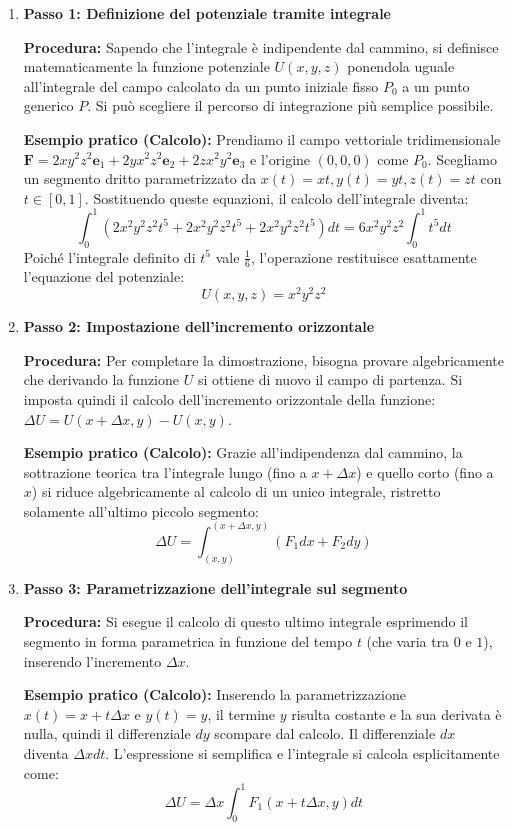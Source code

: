 \begin{enumerate}
    \item \textbf{Passo 1: Definizione del potenziale tramite integrale}
    
    \textbf{Procedura:} Sapendo che l'integrale è indipendente dal cammino, si definisce matematicamente la funzione potenziale $U(x,y,z)$ ponendola uguale all'integrale del campo calcolato da un punto iniziale fisso $P_0$ a un punto generico $P$. Si può scegliere il percorso di integrazione più semplice possibile.
    
    \textbf{Esempio pratico (Calcolo):} Prendiamo il campo vettoriale tridimensionale $\mathbf{F} = 2xy^2z^2 \mathbf{e}_1 + 2yx^2z^2 \mathbf{e}_2 + 2zx^2y^2 \mathbf{e}_3$ e l'origine $(0,0,0)$ come $P_0$. Scegliamo un segmento dritto parametrizzato da $x(t)=xt, y(t)=yt, z(t)=zt$ con $t \in [0,1]$. Sostituendo queste equazioni, il calcolo dell'integrale diventa:
    \[
    \int_{0}^{1} (2x^2y^2z^2 t^5 + 2x^2y^2z^2 t^5 + 2x^2y^2z^2 t^5) dt = 6x^2y^2z^2 \int_{0}^{1} t^5 dt
    \]
    Poiché l'integrale definito di $t^5$ vale $\frac{1}{6}$, l'operazione restituisce esattamente l'equazione del potenziale:
    \[
    U(x,y,z) = x^2y^2z^2
    \]

    \item \textbf{Passo 2: Impostazione dell'incremento orizzontale}
    
    \textbf{Procedura:} Per completare la dimostrazione, bisogna provare algebricamente che derivando la funzione $U$ si ottiene di nuovo il campo di partenza. Si imposta quindi il calcolo dell'incremento orizzontale della funzione: $\Delta U = U(x+\Delta x, y) - U(x,y)$.
    
    \textbf{Esempio pratico (Calcolo):} Grazie all'indipendenza dal cammino, la sottrazione teorica tra l'integrale lungo (fino a $x+\Delta x$) e quello corto (fino a $x$) si riduce algebricamente al calcolo di un unico integrale, ristretto solamente all'ultimo piccolo segmento:
    \[
    \Delta U = \int_{(x,y)}^{(x+\Delta x, y)} (F_1 dx + F_2 dy)
    \]

    \item \textbf{Passo 3: Parametrizzazione dell'integrale sul segmento}
    
    \textbf{Procedura:} Si esegue il calcolo di questo ultimo integrale esprimendo il segmento in forma parametrica in funzione del tempo $t$ (che varia tra $0$ e $1$), inserendo l'incremento $\Delta x$.
    
    \textbf{Esempio pratico (Calcolo):} Inserendo la parametrizzazione $x(t) = x + t\Delta x$ e $y(t) = y$, il termine $y$ risulta costante e la sua derivata è nulla, quindi il differenziale $dy$ scompare dal calcolo. Il differenziale $dx$ diventa $\Delta x dt$. L'espressione si semplifica e l'integrale si calcola esplicitamente come:
    \[
    \Delta U = \Delta x \int_{0}^{1} F_1(x + t\Delta x, y) dt
    \]


\end{enumerate}
